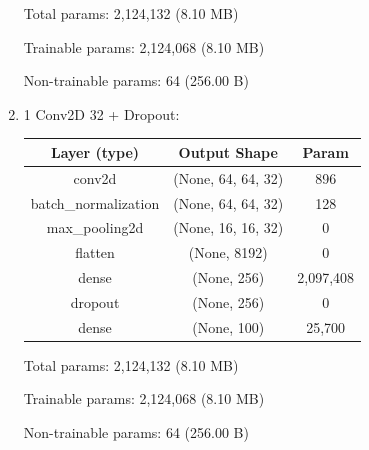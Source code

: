 \documentclass{article}
\begin{document}
\begin{enumerate}
            Total params: 2,124,132 (8.10 MB)

            Trainable params: 2,124,068 (8.10 MB)

            Non-trainable params: 64 (256.00 B)
        
            \item 1 Conv2D 32 + Dropout:
            \begin{table}[h!]
                \begin{tabular}{| c | c | c |}
                    \hline
                    Layer (type) & Output Shape & Param \\
                    \hline
                    conv2d & (None, 64, 64, 32) & 896 \\
                    \hline
                    batch\_normalization & (None, 64, 64, 32) & 128 \\
                    \hline
                    max\_pooling2d & (None, 16, 16, 32) & 0 \\
                    \hline
                    flatten & (None, 8192) & 0 \\
                    \hline
                    dense & (None, 256) & 2,097,408 \\
                    \hline
                    dropout & (None, 256) & 0 \\
                    \hline
                    dense & (None, 100) &  25,700 \\
                    \hline
                \end{tabular}
            \end{table}

            Total params: 2,124,132 (8.10 MB)

            Trainable params: 2,124,068 (8.10 MB)

            Non-trainable params: 64 (256.00 B)
        

\end{enumerate}
\end{document}
